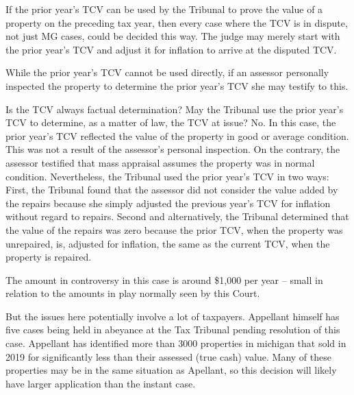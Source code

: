 \documentclass[12pt,\documentclassflag]{michiganCourtOfAppealsBrief}
\begin{document}
If the prior year's TCV can be used by the Tribunal to prove the value of a property on the preceding tax year, then every case where the TCV is in dispute, not just MG cases, could be decided this way. The judge may merely start with the prior year's TCV and adjust it for inflation to arrive at the disputed TCV. 

While the prior year's TCV cannot be used directly, if an assessor personally inspected the property to determine the prior year's TCV she may testify to this. 

Is the TCV always factual determination? 
May the Tribunal use the prior year's TCV to determine, as a matter of law, the TCV at issue? No. 
In this case, the prior year's TCV reflected the value of the property in good or average condition. This was not a result of the assessor's personal inspection. On the contrary, the assessor testified that mass appraisal assumes the property was in normal condition. Nevertheless, the Tribunal used the prior year's TCV in two ways: First, the Tribunal found that the assessor did not consider the value added by the repairs because she simply adjusted the previous year's TCV for inflation without regard to repairs. Second and alternatively, the Tribunal determined that the value of the repairs was zero because the prior TCV, when the property was unrepaired, is, adjusted for inflation, the same as the current TCV, when the property is repaired.








The amount in controversy in this case is around \$1,000 per year -- small in relation to the amounts in play normally seen by this Court.

But the issues here potentially involve a lot of taxpayers.
Appellant himself has five cases being held in abeyance at the Tax Tribunal pending resolution of this case.
Appellant has identified more than 3000 properties in michigan that sold in 2019 for significantly less than their assessed (true cash) value. Many of these properties may be in the same situation as Apellant, so this decision will likely have larger application than the instant case.



\end{document}
